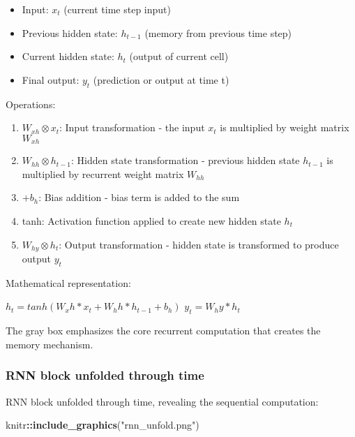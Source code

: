 \documentclass[
]{article}
\newenvironment{Shaded}{\begin{snugshade}}{\end{snugshade}}
\newcommand{\FunctionTok}[1]{\textcolor[rgb]{0.13,0.29,0.53}{\textbf{#1}}}
\newcommand{\NormalTok}[1]{#1}
\newcommand{\SpecialCharTok}[1]{\textcolor[rgb]{0.81,0.36,0.00}{\textbf{#1}}}
\newcommand{\StringTok}[1]{\textcolor[rgb]{0.31,0.60,0.02}{#1}}
\providecommand{\tightlist}{%
  \setlength{\itemsep}{0pt}\setlength{\parskip}{0pt}}
\begin{document}
\begin{itemize}
\tightlist
\item
  Input: \(x_t\) (current time step input)
\item
  Previous hidden state: \(h_{t-1}\) (memory from previous time step)
\item
  Current hidden state: \(h_t\) (output of current cell)
\item
  Final output: \(y_t\) (prediction or output at time t)
\end{itemize}

Operations:

\begin{enumerate}
\def\labelenumi{\arabic{enumi}.}
\tightlist
\item
  \(W_{xh} \otimes x_t\): Input transformation - the input \(x_t\) is
  multiplied by weight matrix \(W_{xh}\)
\item
  \(W_{hh} \otimes h_{t-1}\): Hidden state transformation - previous
  hidden state \(h_{t-1}\) is multiplied by recurrent weight matrix
  \(W_{hh}\)
\item
  \(+ b_h\): Bias addition - bias term is added to the sum
\item
  tanh: Activation function applied to create new hidden state \(h_t\)
\item
  \(W_{hy} \otimes h_t\): Output transformation - hidden state is
  transformed to produce output \(y_t\)
\end{enumerate}

Mathematical representation:

\(h_t = tanh(W_xh * x_t + W_hh * h_{t-1} + b_h)\) \(y_t = W_hy * h_t\)

The gray box emphasizes the core recurrent computation that creates the
memory mechanism.

\subsubsection{RNN block unfolded through
time}\label{rnn-block-unfolded-through-time}

RNN block unfolded through time, revealing the sequential computation:

\begin{Shaded}
\begin{Highlighting}[]
\NormalTok{knitr}\SpecialCharTok{::}\FunctionTok{include\_graphics}\NormalTok{(}\StringTok{"rnn\_unfold.png"}\NormalTok{)}
\end{Highlighting}
\end{Shaded}
\end{document}
